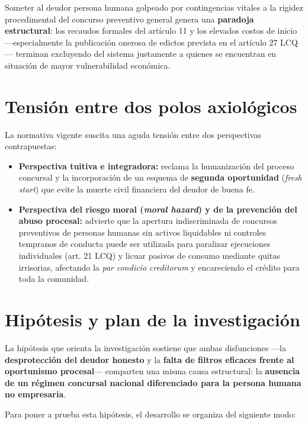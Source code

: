 \documentclass[12pt,oneside]{book}
\begin{document}
Someter al deudor persona humana golpeado por contingencias vitales a la rigidez procedimental del concurso preventivo general genera una \textbf{paradoja estructural}: los recaudos formales del artículo 11 y los elevados costos de inicio ---especialmente la publicación onerosa de edictos prevista en el artículo 27 LCQ--- terminan excluyendo del sistema justamente a quienes se encuentran en situación de mayor vulnerabilidad económica.

\section{Tensión entre dos polos axiológicos}

La normativa vigente suscita una aguda tensión entre dos perspectivas contrapuestas:

\begin{itemize}
    \item \textbf{Perspectiva tuitiva e integradora:} reclama la humanización del proceso concursal y la incorporación de un esquema de \textbf{segunda oportunidad} (\textit{fresh start}) que evite la muerte civil financiera del deudor de buena fe.
    \item \textbf{Perspectiva del riesgo moral (\textit{moral hazard}) y de la prevención del abuso procesal:} advierte que la apertura indiscriminada de concursos preventivos de personas humanas sin activos liquidables ni controles tempranos de conducta puede ser utilizada para paralizar ejecuciones individuales (art. 21 LCQ) y licuar pasivos de consumo mediante quitas irrisorias, afectando la \textit{par condicio creditorum} y encareciendo el crédito para toda la comunidad.
\end{itemize}

\section{Hipótesis y plan de la investigación}

La hipótesis que orienta la investigación sostiene que ambas disfunciones ---la \textbf{desprotección del deudor honesto} y la \textbf{falta de filtros eficaces frente al oportunismo procesal}--- comparten una misma causa estructural: la \textbf{ausencia de un régimen concursal nacional diferenciado para la persona humana no empresaria}.

Para poner a prueba esta hipótesis, el desarrollo se organiza del siguiente modo:
\end{document}
